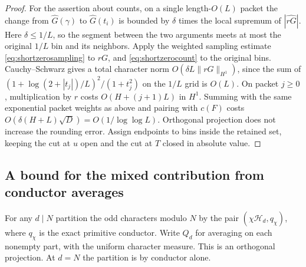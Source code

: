 \documentclass[11pt,a4paper]{article}
\numberwithin{equation}{section}
\begin{document}
\begin{proof}
For the assertion about counts, on a single length-$O(L)$ packet
the change from $\widehat G(\gamma)$ to $\widehat G(t_i)$ is
bounded by $\delta$ times the local supremum of $|\widehat{rG}|$.
Here $\delta\le1/L$, so the segment between the two arguments
meets at most the original $1/L$ bin and its neighbors.
Apply the weighted sampling estimate \eqref{eq:shortzerosampling}
to $rG$, and \eqref{eq:shortzerocount} to the original bins.
Cauchy--Schwarz gives a total character norm
$O(\delta L\|rG\|_{H^1})$, since the sum of
$(1+\log(2+|t_j|)/L)^2/(1+t_j^2)$ on the $1/L$ grid is $O(L)$.
On packet $j\ge0$, multiplication by $r$ costs
$O(H+(j+1)L)$ in $H^1$. Summing with the same exponential packet
weights as above and pairing with $c(F)$ costs
$O(\delta(H+L)\sqrt D)=O(1/\log\log L)$. Orthogonal projection
does not increase the rounding error. Assign endpoints to bins
inside the retained set, keeping the cut at $u$ open and the cut
at $T$ closed in absolute value.
\end{proof}

\subsection{A bound for the mixed contribution from conductor averages}

For any $d\mid N$ partition the odd characters modulo $N$ by
the pair $(\chi\mathcal H_d,q_\chi)$, where $q_\chi$ is the
exact primitive conductor. Write $Q_d$ for averaging on each
nonempty part, with the uniform character measure. This is an
orthogonal projection. At $d=N$ the partition is by conductor alone.
\end{document}
